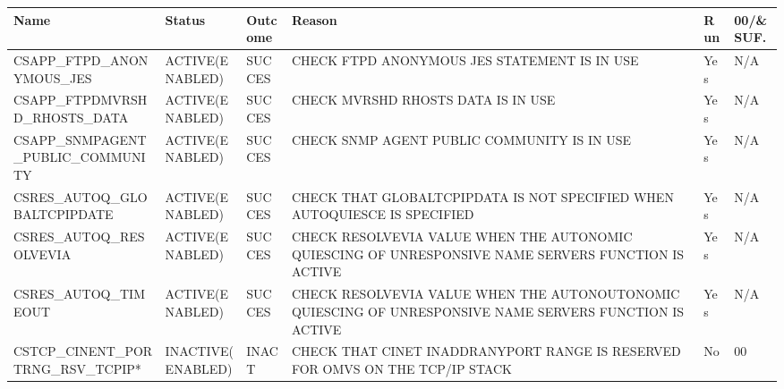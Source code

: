 \begin{landscape}
	\begin{table}[h]
		\begin{tabular}{|l|l|l|p{4.5cm}|l|l|}
			\hline
			\textbf{Name}                       & \textbf{Status}   & \textbf{Outcome} & \textbf{Reason}                                                                                                & \textbf{Run} & \textbf{00/\&SUF.} \\ \hline
			CSAPP\_FTPD\_ANONYMOUS\_JES         & ACTIVE(ENABLED)   & SUCCES           & CHECK   FTPD ANONYMOUS JES STATEMENT IS IN USE                                                                 & Yes          & N/A                \\ \hline
			CSAPP\_FTPDMVRSHD\_RHOSTS\_DATA     & ACTIVE(ENABLED)   & SUCCES           & CHECK   MVRSHD RHOSTS DATA IS IN USE                                                                           & Yes          & N/A                \\ \hline
			CSAPP\_SNMPAGENT\_PUBLIC\_COMMUNITY & ACTIVE(ENABLED)   & SUCCES           & CHECK   SNMP AGENT PUBLIC COMMUNITY IS IN USE                                                                  & Yes          & N/A                \\ \hline
			CSRES\_AUTOQ\_GLOBALTCPIPDATE       & ACTIVE(ENABLED)   & SUCCES           & CHECK   THAT GLOBALTCPIPDATA IS NOT    SPECIFIED   WHEN AUTOQUIESCE IS SPECIFIED                               & Yes          & N/A                \\ \hline
			CSRES\_AUTOQ\_RESOLVEVIA            & ACTIVE(ENABLED)   & SUCCES           & CHECK   RESOLVEVIA VALUE WHEN THE AUTONOMIC QUIESCING OF UNRESPONSIVE NAME SERVERS FUNCTION IS ACTIVE          & Yes          & N/A                \\ \hline
			CSRES\_AUTOQ\_TIMEOUT               & ACTIVE(ENABLED)   & SUCCES           & CHECK   RESOLVEVIA VALUE WHEN THE AUTONOUTONOMIC QUIESCING OF UNRESPONSIVE   NAME   SERVERS FUNCTION IS ACTIVE & Yes          & N/A                \\ \hline
			CSTCP\_CINENT\_PORTRNG\_RSV\_TCPIP* & INACTIVE(ENABLED) & INACT            & CHECK   THAT CINET INADDRANYPORT RANGE IS   RESERVED   FOR OMVS ON THE TCP/IP STACK                            & No           & 00                 \\ \hline
		\end{tabular}
	\end{table}
\end{landscape}

